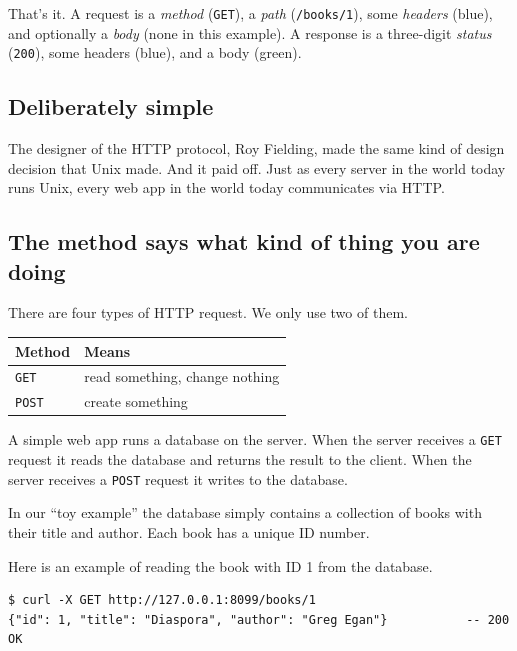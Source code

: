 \documentclass[11pt,a4paper]{article}
\begin{document}
That's it. A request is a \emph{method} (\texttt{GET}), a \emph{path} (\texttt{/books/1}), some
\emph{headers} (blue), and optionally a \emph{body} (none in this example). A response is a
three-digit \emph{status} (\texttt{200}), some headers (blue), and a body (green).

\subsection{Deliberately simple}

The designer of the HTTP protocol, Roy Fielding, made the same kind of design decision that Unix
made. And it paid off. Just as every server in the world today runs Unix, every web app in the
world today communicates via HTTP.

\newpage

\subsection{The method says what kind of thing you are doing}

There are four types of HTTP request. We only use two of them.

\begin{center}
\begin{tabular}{ll}
\toprule
\textbf{Method} & \textbf{Means} \\
\midrule
\texttt{GET}    & read something, change nothing \\
\texttt{POST}   & create something \\
\bottomrule
\end{tabular}
\end{center}

A simple web app runs a database on the server. When the server receives a \texttt{GET} request it
reads the database and returns the result to the client. When the server receives a \texttt{POST}
request it writes to the database.

In our ``toy example'' the database simply contains a collection of books with their title and
author. Each book has a unique ID number.

Here is an example of reading the book with ID 1 from the database.

\begin{lstlisting}[language=SH]
$ curl -X GET http://127.0.0.1:8099/books/1
{"id": 1, "title": "Diaspora", "author": "Greg Egan"}           -- 200 OK
\end{lstlisting}
\end{document}
